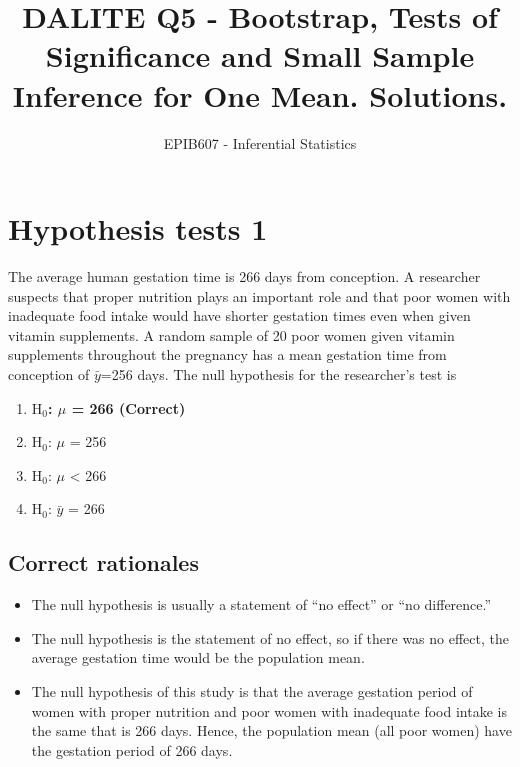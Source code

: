 \documentclass[letterpaper,9pt,twoside,printwatermark=false]{pinp}
\title{DALITE Q5 - Bootstrap, Tests of Significance and Small Sample Inference
for One Mean. Solutions.}
\author[a]{EPIB607 - Inferential Statistics}
\affil[a]{Fall 2018, McGill University}
\providecommand{\tightlist}{%
  \setlength{\itemsep}{0pt}\setlength{\parskip}{0pt}}
\begin{document}
\verticaladjustment{-2pt}

\maketitle
\thispagestyle{firststyle}



\section{Hypothesis tests 1}\label{hypothesis-tests-1}

The average human gestation time is 266 days from conception. A
researcher suspects that proper nutrition plays an important role and
that poor women with inadequate food intake would have shorter gestation
times even when given vitamin supplements. A random sample of 20 poor
women given vitamin supplements throughout the pregnancy has a mean
gestation time from conception of \(\bar{y}\)=256 days. The null
hypothesis for the researcher's test is

\begin{enumerate}
\def\labelenumi{\alph{enumi}.}
\tightlist
\item
  \textbf{\(\textrm{H}_0\): \(\mu\) = 266 (Correct)}
\item
  \(\textrm{H}_0\): \(\mu\) = 256
\item
  \(\textrm{H}_0\): \(\mu\) \textless{} 266
\item
  \(\textrm{H}_0\): \(\bar{y}\) = 266
\end{enumerate}

\subsection{Correct rationales}\label{correct-rationales}

\begin{itemize}
\tightlist
\item
  The null hypothesis is usually a statement of ``no effect'' or ``no
  difference.''
\item
  The null hypothesis is the statement of no effect, so if there was no
  effect, the average gestation time would be the population mean.
\item
  The null hypothesis of this study is that the average gestation period
  of women with proper nutrition and poor women with inadequate food
  intake is the same that is 266 days. Hence, the population mean (all
  poor women) have the gestation period of 266 days.
\end{itemize}
\end{document}
